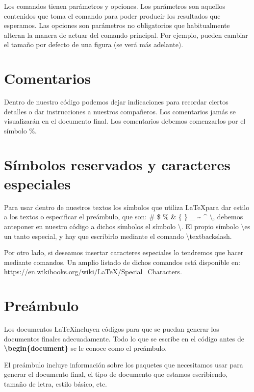 \documentclass[12pt]{book} %
\begin{document}
Los comandos tienen parámetros y opciones. Los parámetros son aquellos contenidos que toma el comando para poder producir los resultados que esperamos. Las opciones son parámetros no obligatorios que habitualmente alteran la manera de actuar del comando principal. Por ejemplo, pueden cambiar el tamaño por defecto de una figura (se verá más adelante).

\section{Comentarios} %

Dentro de nuestro código podemos dejar indicaciones para recordar ciertos detalles o dar instrucciones a nuestros compañeros. Los comentarios jamás se visualizarán en el documento final. Los comentarios debemos comenzarlos por el símbolo \%.

\section{Símbolos reservados y caracteres especiales}

Para usar dentro de nuestros textos los símbolos que utiliza \LaTeX para dar estilo a los textos o especificar el preámbulo, que son: \# \$ \% \& \{ \} \_ \~{} \^{} \textbackslash, debemos anteponer en nuestro código a dichos símbolos el símbolo \textbackslash. El propio símbolo \textbackslash es un tanto especial, y hay que escribirlo mediante el comando \textbackslash textbackslash.

Por otro lado, si deseamos insertar caracteres especiales lo tendremos que hacer mediante comandos. Un amplio listado de dichos comandos está disponible en: \url{https://en.wikibooks.org/wiki/LaTeX/Special_Characters}. 

\section{Preámbulo}

Los documentos \LaTeX incluyen códigos para que se puedan generar los documentos finales adecuadamente.  Todo lo que se escribe en el código antes de \textbf{\textbackslash begin\{document\}} se le conoce como el preámbulo.

El preámbulo incluye información sobre los paquetes que necesitamos usar para generar el documento final, el tipo de documento que estamos escribiendo, tamaño de letra, estilo básico, etc.
\end{document}
